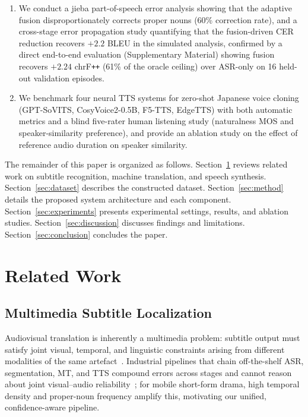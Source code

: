 \documentclass[journal]{IEEEtran}
\begin{document}
\begin{enumerate}
 \item We conduct a jieba part-of-speech error analysis showing that the adaptive fusion disproportionately corrects proper nouns (60\% correction rate), and a cross-stage error propagation study quantifying that the fusion-driven CER reduction recovers $+2.2$ BLEU in the simulated analysis, confirmed by a direct end-to-end evaluation (Supplementary Material) showing fusion recovers $+2.24$ chrF\texttt{++} (61\% of the oracle ceiling) over ASR-only on 16 held-out validation episodes.
 \item We benchmark four neural TTS systems for zero-shot Japanese voice cloning (GPT-SoVITS, CosyVoice2-0.5B, F5-TTS, EdgeTTS) with both automatic metrics and a blind five-rater human listening study (naturalness MOS and speaker-similarity preference), and provide an ablation study on the effect of reference audio duration on speaker similarity.
\end{enumerate}

The remainder of this paper is organized as follows.
Section~\ref{sec:related} reviews related work on subtitle recognition, machine translation, and speech synthesis.
Section~\ref{sec:dataset} describes the constructed dataset.
Section~\ref{sec:method} details the proposed system architecture and each component.
Section~\ref{sec:experiments} presents experimental settings, results, and ablation studies.
Section~\ref{sec:discussion} discusses findings and limitations.
Section~\ref{sec:conclusion} concludes the paper.

\section{Related Work}
\label{sec:related}

\subsection{Multimedia Subtitle Localization}
Audiovisual translation is inherently a multimedia problem: subtitle output must satisfy joint visual, temporal, and linguistic constraints arising from different modalities of the same artefact~\cite{matusov2019challenges}.
Industrial pipelines that chain off-the-shelf ASR, segmentation, MT, and TTS compound errors across stages and cannot reason about joint visual--audio reliability~\cite{matusov2019challenges}; for mobile short-form drama, high temporal density and proper-noun frequency amplify this, motivating our unified, confidence-aware pipeline.
\end{document}
